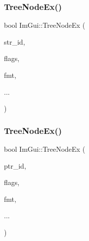 \mbox{\label{namespace_im_gui_a9ca2fae922b38cfddc3259f874c18a5d}} 
\subsubsection{\texorpdfstring{Tree\+Node\+Ex()}{TreeNodeEx()}\hspace{0.1cm}{\footnotesize\ttfamily [2/3]}}
{\footnotesize\ttfamily bool Im\+Gui\+::\+Tree\+Node\+Ex (\begin{DoxyParamCaption}\item[{const char $\ast$}]{str\+\_\+id,  }\item[{\mbox{\hyperlink{imgui_8h_a0588fdd10c59b49a0159484fe9ec4564}{Im\+Gui\+Tree\+Node\+Flags}}}]{flags,  }\item[{const char $\ast$}]{fmt,  }\item[{}]{... }\end{DoxyParamCaption})}

\mbox{\label{namespace_im_gui_adce362ad94baa9b00f5914cbcab00452}} 
\subsubsection{\texorpdfstring{Tree\+Node\+Ex()}{TreeNodeEx()}\hspace{0.1cm}{\footnotesize\ttfamily [3/3]}}
{\footnotesize\ttfamily bool Im\+Gui\+::\+Tree\+Node\+Ex (\begin{DoxyParamCaption}\item[{const void $\ast$}]{ptr\+\_\+id,  }\item[{\mbox{\hyperlink{imgui_8h_a0588fdd10c59b49a0159484fe9ec4564}{Im\+Gui\+Tree\+Node\+Flags}}}]{flags,  }\item[{const char $\ast$}]{fmt,  }\item[{}]{... }\end{DoxyParamCaption})}

\mbox{\label{namespace_im_gui_a251cd4acbdad4cef2246d9b573a83ce0}} 
